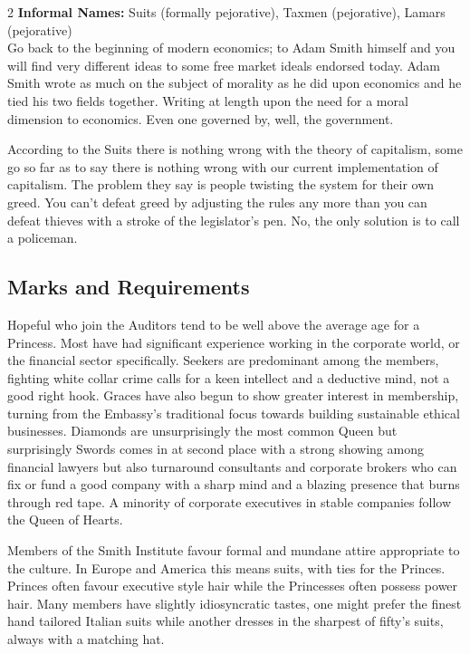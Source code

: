 \begin{multicols}{2}
\noindent \textbf{Informal Names:} Suits (formally pejorative), Taxmen (pejorative), Lamars (pejorative) \\


Go back to the beginning of modern economics; to Adam Smith himself and you will find very different ideas to some free market ideals endorsed today. Adam Smith wrote as much on the subject of morality as he did upon economics and he tied his two fields together. Writing at length upon the need for a moral dimension to economics. Even one governed by, well, the government.

According to the Suits there is nothing wrong with the theory of capitalism, some go so far as to say there is nothing wrong with our current implementation of capitalism. The problem they say is people twisting the system for their own greed. You can't defeat greed by adjusting the rules any more than you can defeat thieves with a stroke of the legislator's pen. No, the only solution is to call a policeman. 

\subsection*{Marks and Requirements}

Hopeful who join the Auditors tend to be well above the average age for a Princess. Most have had significant experience working in the corporate world, or the financial sector specifically. Seekers are predominant among the members, fighting white collar crime calls for a keen intellect and a deductive mind, not a good right hook. Graces have also begun to show greater interest in membership, turning from the Embassy's traditional focus towards building sustainable ethical businesses. Diamonds are unsurprisingly the most common Queen but surprisingly Swords comes in at second place with a strong showing among financial lawyers but also turnaround consultants and corporate brokers who can fix or fund a good company with a sharp mind and a blazing presence that burns through red tape. A minority of corporate executives in stable companies follow the Queen of Hearts.

Members of the Smith Institute favour formal and mundane attire appropriate to the culture. In Europe and America this means suits, with ties for the Princes. Princes often favour executive style hair while the Princesses often possess power hair. Many members have slightly idiosyncratic tastes, one might prefer the finest hand tailored Italian suits while another dresses in the sharpest of fifty's suits, always with a matching hat.


\end{multicols}
